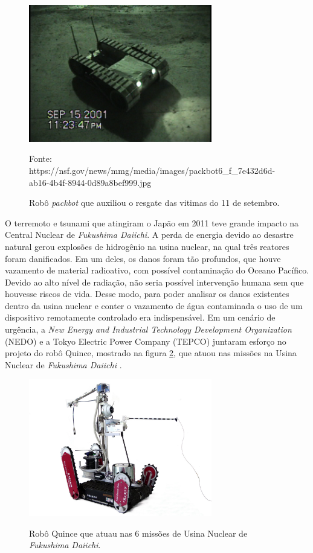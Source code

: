  \begin{figure}[H]
        \centering
        \caption{Robô \textit{packbot} que auxiliou o resgate das vitimas do 11 de setembro.}
        \includegraphics[width=8cm]{./figs/packbot.jpg}
        \par\medskip
Fonte: https://nsf.gov/news/mmg/media/images/packbot6\_f\_7e432d6d-ab16-4b4f-8944-0d89a8bef999.jpg
        \label{fig:packbot}
\end{figure}

O terremoto e tsunami que atingiram o Japão em 2011 teve grande impacto na Central Nuclear de \textit{Fukushima Daiichi}. A perda de energia devido ao desastre natural gerou explosões de hidrogênio na usina nuclear, na qual três reatores foram danificados. Em um deles, os danos foram tão profundos, que houve vazamento de material radioativo, com possível contaminação do Oceano Pacífico. Devido ao alto nível de radiação, não seria possível intervenção humana sem que houvesse riscos de vida.
Desse modo, para poder analisar os danos existentes dentro da usina nuclear e conter o vazamento de água contaminada o uso de um dispositivo remotamente controlado era indispensável.
Em um cenário de urgência, a \textit{New Energy and Industrial Technology Development Organization} (NEDO) e a \textit{}{Tokyo Electric Power Company (TEPCO)} juntaram esforço no projeto do robô Quince, mostrado na figura \ref{fig:quince}, que atuou nas missões na Usina Nuclear de \textit{Fukushima Daiichi} \cite{nagatani2013emergency}.

 \begin{figure}[H]  
        \centering
        \caption{Robô \textit{}{Quince} que atuau nas 6 missões de Usina Nuclear de \textit{Fukushima Daiichi}.}
        \includegraphics[width=8cm]{./figs/quince.jpg}
        \label{fig:quince}
\end{figure}

